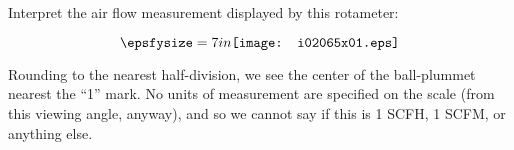

Interpret the air flow measurement displayed by this rotameter:

$$\epsfysize=7in \texttt{[image: i02065x01.eps]}$$







Rounding to the nearest half-division, we see the center of the ball-plummet nearest the ``1'' mark.  No units of measurement are specified on the scale (from this viewing angle, anyway), and so we cannot say if this is 1 SCFH, 1 SCFM, or anything else.
 










